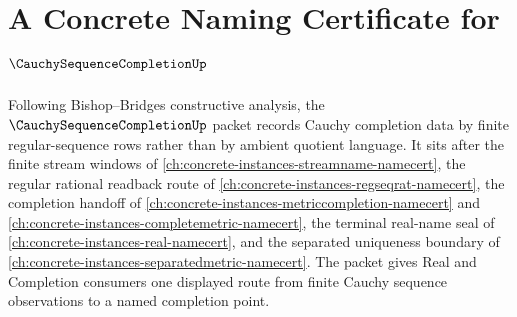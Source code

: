 \chapter{A Concrete Naming Certificate for $\CauchySequenceCompletionUp$}
\label{ch:concrete-instances-cauchy-sequence-completion-namecert}

Following Bishop--Bridges constructive analysis, the $\CauchySequenceCompletionUp$ packet records Cauchy completion data by finite regular-sequence rows rather than by ambient quotient language. It sits after the finite stream windows of \autoref{ch:concrete-instances-streamname-namecert}, the regular rational readback route of \autoref{ch:concrete-instances-regseqrat-namecert}, the completion handoff of \autoref{ch:concrete-instances-metriccompletion-namecert} and \autoref{ch:concrete-instances-completemetric-namecert}, the terminal real-name seal of \autoref{ch:concrete-instances-real-namecert}, and the separated uniqueness boundary of \autoref{ch:concrete-instances-separatedmetric-namecert}. The packet gives Real and Completion consumers one displayed route from finite Cauchy sequence observations to a named completion point.

